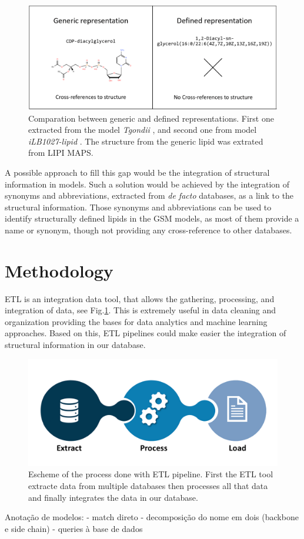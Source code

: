 \documentclass{llncs}
\begin{document}
\begin{figure}
    \includegraphics[width=\textwidth]{imagens/comparação.png}
    \caption{Comparation between generic and defined representations. First one extracted from the model \textit{Tgondii} \cite{Tymoshenko2015}, and second one from model \textit{iLB1027-lipid} \cite{Levering2016}. The structure from the generic lipid was extrated from LIPI MAPS.}
\end{figure}

A possible approach to fill this gap would be the integration of structural information in models. 
Such a solution would be achieved by the integration of synonyms and abbreviations, extracted from \textit{de facto} databases, as a link to the structural information. Those synonyms and abbreviations can be used to identify structurally defined lipids in the GSM models, as most of them provide a name or synonym, though not providing any cross-reference to other databases. 

\section{Methodology}

ETL is an integration data tool, that allows the gathering, processing, and integration of data, see Fig.\ref{fig4}. 
This is extremely useful in data cleaning and organization providing the bases for data analytics and machine learning approaches. 
Based on this, ETL pipelines could make easier the integration of structural information in our database.

\begin{figure}
    \includegraphics[width=\textwidth]{imagens/ETL.png}
    \caption{Escheme of the process done with ETL pipeline.
    First the ETL tool extracte data from multiple databases
    then processes all that data
    and finally integrates the data in our database.} \label{fig4}    
\end{figure}

Anotação de modelos:
    - match direto
    - decomposição do nome em dois (backbone e side chain) - queries à base de dados





\end{document}
